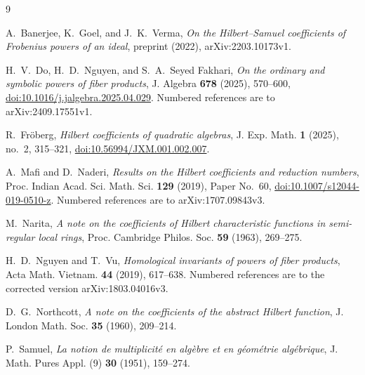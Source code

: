 \documentclass{amsart}
\theoremstyle{definition}
\theoremstyle{remark}
\numberwithin{equation}{section}
\begin{document}
\begin{thebibliography}{9}

A.~Banerjee, K.~Goel, and J.~K.~Verma,
\emph{On the Hilbert--Samuel coefficients of Frobenius powers of an ideal},
preprint (2022), arXiv:2203.10173v1.

H.~V.~Do, H.~D.~Nguyen, and S.~A.~Seyed Fakhari,
\emph{On the ordinary and symbolic powers of fiber products},
J. Algebra \textbf{678} (2025), 570--600, \href{https://doi.org/10.1016/j.jalgebra.2025.04.029}{doi:10.1016/j.jalgebra.2025.04.029}.
Numbered references are to arXiv:2409.17551v1.

R.~Fr\"oberg,
\emph{Hilbert coefficients of quadratic algebras},
J. Exp. Math. \textbf{1} (2025), no.~2, 315--321, \href{https://doi.org/10.56994/JXM.001.002.007}{doi:10.56994/JXM.001.002.007}.

A.~Mafi and D.~Naderi,
\emph{Results on the Hilbert coefficients and reduction numbers},
Proc. Indian Acad. Sci. Math. Sci. \textbf{129} (2019), Paper No.~60,
\href{https://doi.org/10.1007/s12044-019-0510-z}{doi:10.1007/s12044-019-0510-z}. Numbered references are to
arXiv:1707.09843v3.

M.~Narita,
\emph{A note on the coefficients of Hilbert characteristic functions in
semi-regular local rings},
Proc. Cambridge Philos. Soc. \textbf{59} (1963), 269--275.

H.~D.~Nguyen and T.~Vu,
\emph{Homological invariants of powers of fiber products},
Acta Math. Vietnam. \textbf{44} (2019), 617--638. Numbered references are to
the corrected version arXiv:1803.04016v3.

D.~G.~Northcott,
\emph{A note on the coefficients of the abstract Hilbert function},
J. London Math. Soc. \textbf{35} (1960), 209--214.

P.~Samuel,
\emph{La notion de multiplicit\'e en alg\`ebre et en g\'eom\'etrie alg\'ebrique},
J. Math. Pures Appl. (9) \textbf{30} (1951), 159--274.

\end{thebibliography}
\end{document}
